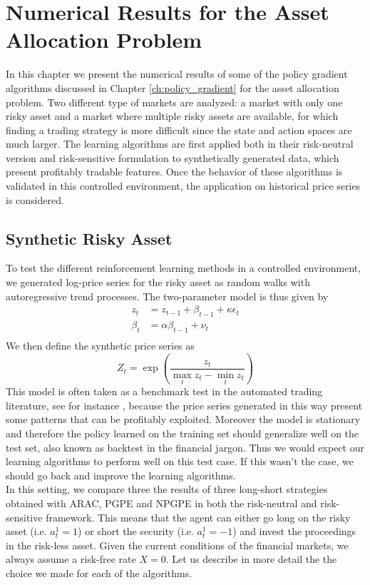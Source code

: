 \chapter{Numerical Results for the Asset Allocation Problem}
\label{ch:numerical_results}

In this chapter we present the numerical results of some of the policy gradient algorithms discussed in Chapter \ref{ch:policy_gradient} for the asset allocation problem. Two different type of markets are analyzed: a market with only one risky asset and a market where multiple risky assets are available, for which finding a trading strategy is more difficult since the state and action spaces are much larger. The learning algorithms are first applied both in their risk-neutral version and risk-sensitive formulation to synthetically generated data, which present profitably tradable features. Once the behavior of these algorithms is validated in this controlled environment, the application on historical price series is considered. 

\section{Synthetic Risky Asset}
\label{sec:synthetic_risky_asset}
To test the different reinforcement learning methods in a controlled environment, we generated log-price series for the risky asset as random walks with autoregressive trend processes. The two-parameter model is thus given by
\begin{equation*}
	\begin{split}
		z_t &= z_{t-1} + \beta_{t-1} + \kappa \epsilon_t\\
		\beta_t &= \alpha \beta_{t-1} + \nu_t\\
	\end{split}
\end{equation*}
We then define the synthetic price series as
\begin{equation*}
	Z_t = \exp\left(\frac{z_t}{\max_t z_t - \min_t z_t}\right)
\end{equation*}
This model is often taken as a benchmark test in the automated trading literature, see for instance \cite{moody1998performance}, because the price series generated in this way present some patterns that can be profitably exploited. Moreover the model is stationary and therefore the policy learned on the training set should generalize well on the test set, also known as backtest in the financial jargon. Thus we would expect our learning algorithms to perform well on this test case. If this wasn't the case, we should go back and improve the learning algorithms.\\
In this setting, we compare three the results of three long-short strategies obtained with \gls{ARAC}, \gls{PGPE} and \gls{NPGPE} in both the risk-neutral and risk-sensitive framework. This means that the agent can either go long on the risky asset (i.e. $a_t^1 = 1$) or short the security (i.e. $a_t^1 = -1$) and invest the proceedings in the risk-less asset. Given the current conditions of the financial markets, we always assume a risk-free rate $X = 0$. Let us describe in more detail the the choice we made for each of the algorithms. 

